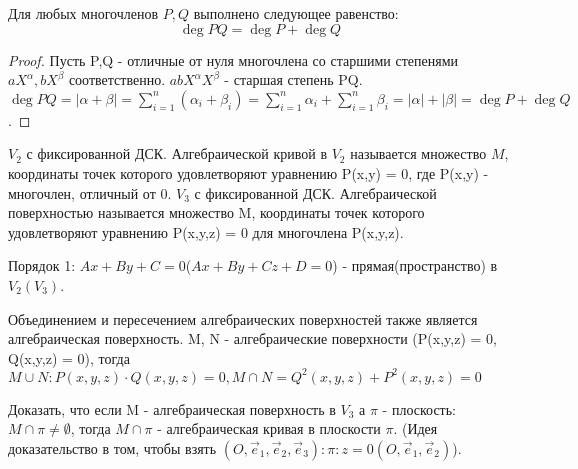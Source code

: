 \begin{proposition}
	Для любых многочленов $P, Q$ выполнено следующее равенство:
	\[\deg{PQ} = \deg{P} + \deg{Q}\]
\end{proposition}

\begin{proof}
	Пусть P,Q - отличные от нуля многочлена со старшими степенями \(aX^\alpha, bX^\beta\) соответственно. \(abX^\alpha X^\beta\) - старшая степень PQ. \newline
	\(\deg PQ = |\alpha+\beta| = \sum_{i=1}^{n}(\alpha_i+\beta_i) = \sum_{i=1}^{n}\alpha_i + \sum_{i=1}^{n}\beta_i = |\alpha|+|\beta| = \deg P + \deg Q\).
\end{proof}

\begin{definition}
	\(V_2\) с фиксированной ДСК. Алгебраической кривой в \(V_2\) называется множество \(M\), координаты точек которого удовлетворяют уравнению P(x,y) = 0, где P(x,y) - многочлен, отличный от 0.\newline
	\(V_3\) с фиксированной ДСК. Алгебраической поверхностью называется множество M, координаты точек которого удовлетворяют уравнению P(x,y,z) = 0 для многочлена P(x,y,z).
\end{definition}
Порядок 1: \(Ax + By+C = 0\)(\(Ax+By+Cz+D = 0\)) - прямая(пространство) в \(V_2(V_3)\).
\begin{proposition}
	Объединением и пересечением алгебраических поверхностей также является алгебраическая поверхность. M, N - алгебраические поверхности (P(x,y,z) = 0, Q(x,y,z) = 0), тогда \(M\cup N: P(x,y,z)\cdot Q(x,y,z) = 0, M\cap N = Q^2(x,y,z) + P^2(x,y,z) = 0\)
\end{proposition}

\begin{note}
	Доказать, что если M - алгебраическая поверхность в \(V_3\) а $\pi$ - плоскость:\(M\cap\pi\ne\emptyset\), тогда \(M\cap\pi\) - алгебраическая кривая в плоскости $\pi$.
	(Идея доказательство в том, чтобы взять $(O,\vec e_1, \vec e_2, \vec e_3):\pi: z = 0(O,\vec e_1, \vec e_2)$).
\end{note}




